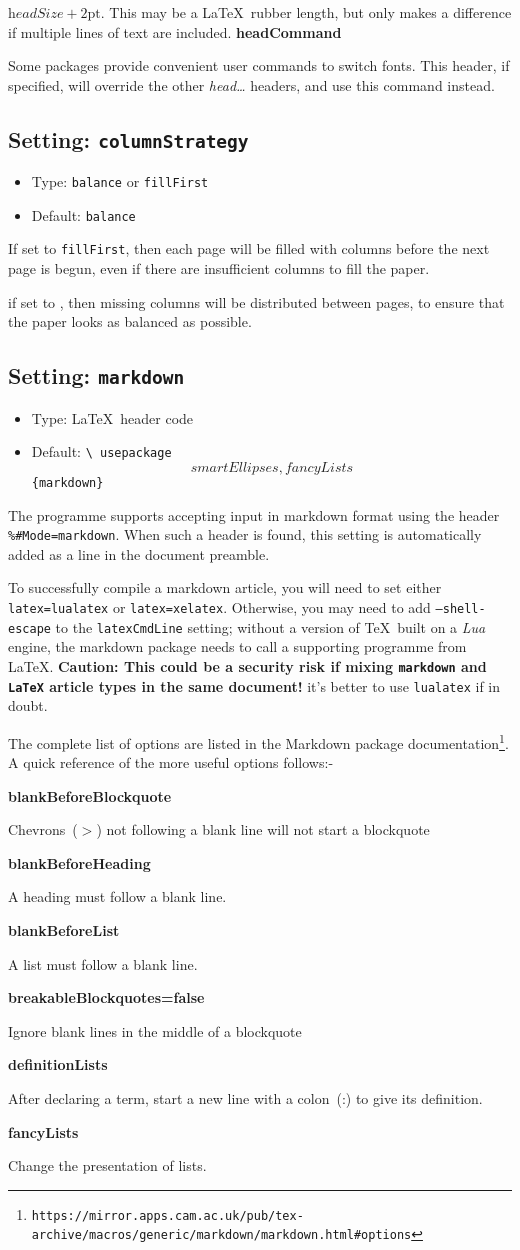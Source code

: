 \documentclass[a4paper,DIV=11]{scrartcl}
\newcommand{\deft}[2]{\nopagebreak\noindent\hspace{0.5in}\textbf{#1}\par\noindent{}#2\pagebreak[1]\par}
\newcommand{\property}[5]{
  \subsection{#1: \texttt{#2}}
  \begin{itemize}
  \item Type: #3
  \item Default: #4
  \end{itemize}
  #5
}
\newcommand{\setting}{\property{Setting}}
\begin{document}
\begin{multicols}{2}
{{    $\textit{headSize} + 2\textrm{pt}$. This may be a \LaTeX\ rubber
    length, but only makes a difference if multiple lines of text are
    included.}
  \deft{headCommand}{Some packages provide convenient user commands to
    switch fonts. This header, if specified, will override the other
    \textit{head\dots} headers, and use this command instead.
  }
}
\setting{columnStrategy}{\texttt{balance} or \texttt{fillFirst}}{\texttt{balance}}{
  If set to \texttt{fillFirst}, then each page will be filled with columns before the next
  page is begun, even if there are insufficient columns to fill the paper.\par
  if set to \textt{balance}, then missing columns will be distributed between pages, to ensure
  that the paper looks as balanced as possible.
}
\setting{markdown}{\LaTeX\ header code}{\texttt{\textbackslash
    usepackage\[smartEllipses,fancyLists\]\{markdown\}}}{
    The programme supports accepting input in markdown format using the
    header \texttt{\%\#Mode=markdown}. When such a header is found,
    this setting is automatically added as a line in the document
    preamble.\par
    To successfully compile a markdown article, you will need to set either
    \texttt{latex=lualatex} or \texttt{latex=xelatex}.
    Otherwise, you may need to add
    \texttt{--shell-escape} to the \texttt{latexCmdLine} setting;
    without a version of \TeX\ built on a \textit{Lua} engine, the
    markdown package needs to call a
    supporting programme from \LaTeX. \textbf{Caution: This could be a
      security risk if mixing \texttt{markdown} and \texttt{LaTeX}
      article types in the same document!} it's better to use
    \texttt{lualatex} if in doubt.\par
    The complete list of options are listed in the Markdown package
    documentation\footnote{\texttt{https://mirror.apps.cam.ac.uk/pub/tex-archive/macros/generic/markdown/markdown.html\#options}}. A
    quick reference of the more useful options follows:-\par
    \deft{blankBeforeBlockquote}{Chevrons~($>$) not following a
      blank line will not start a blockquote}
    \deft{blankBeforeHeading}{A heading must follow a blank line.}
    \deft{blankBeforeList}{A list must follow a blank line.}
    \deft{breakableBlockquotes=false}{Ignore blank lines in the middle
      of a blockquote}
    \deft{definitionLists}{After declaring a term, start a new
      line with a colon~(:) to give its definition.}
    \deft{fancyLists}{Change the presentation of lists.}
}
\end{multicols}
\end{document}
